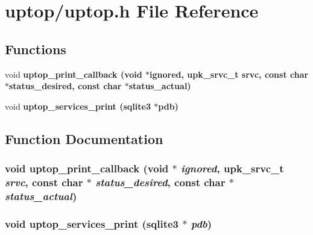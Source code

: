 \section{uptop/uptop.h File Reference}
\label{uptop_8h}
\subsection*{Functions}
\begin{CompactItemize}
\item 
void \bf{uptop\_\-print\_\-callback} (void $\ast$ignored, upk\_\-srvc\_\-t srvc, const char $\ast$status\_\-desired, const char $\ast$status\_\-actual)
\item 
void \bf{uptop\_\-services\_\-print} (sqlite3 $\ast$pdb)
\end{CompactItemize}


\subsection{Function Documentation}
\subsubsection{\setlength{\rightskip}{0pt plus 5cm}void uptop\_\-print\_\-callback (void $\ast$ {\em ignored}, upk\_\-srvc\_\-t {\em srvc}, const char $\ast$ {\em status\_\-desired}, const char $\ast$ {\em status\_\-actual})}\label{uptop_8h_2c839c25b82e23765d6d2de68c08dcd7}


\subsubsection{\setlength{\rightskip}{0pt plus 5cm}void uptop\_\-services\_\-print (sqlite3 $\ast$ {\em pdb})}\label{uptop_8h_e45ae19281a114bc2579a125abbcadbb}


